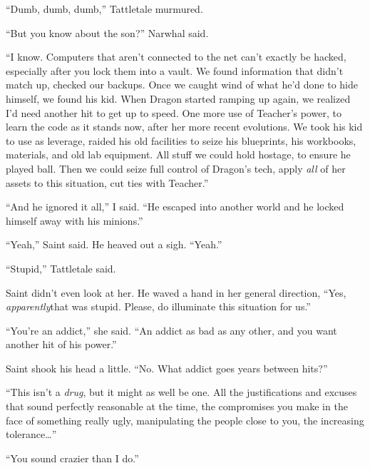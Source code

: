 ``Dumb, dumb, dumb,'' Tattletale murmured.



``But you know about the son?'' Narwhal said.



``I know.  Computers that aren't connected to the net can't exactly be hacked, especially after you lock them into a vault.  We found information that didn't match up, checked our backups.  Once we caught wind of what he'd done to hide himself, we found his kid.  When Dragon started ramping up again, we realized I'd need another hit to get up to speed.  One more use of Teacher's power, to learn the code as it stands now, after her more recent evolutions.  We took his kid to use as leverage, raided his old facilities to seize his blueprints, his workbooks, materials, and old lab equipment.  All stuff we could hold hostage, to ensure he played ball.  Then we could seize full control of Dragon's tech, apply \emph{all} of her assets to this situation, cut ties with Teacher.''



``And he ignored it all,'' I said.  ``He escaped into another world and he locked himself away with his minions.''



``Yeah,'' Saint said.  He heaved out a sigh.  ``Yeah.''



``Stupid,'' Tattletale said.



Saint didn't even look at her.  He waved a hand in her general direction, ``Yes, \emph{apparently}that was stupid.  Please, do illuminate this situation for us.''



``You're an addict,'' she said.  ``An addict as bad as any other, and you want another hit of his power.''



Saint shook his head a little.  ``No.  What addict goes years between hits?''



``This isn't a \emph{drug}, but it might as well be one.  All the justifications and excuses that sound perfectly reasonable at the time, the compromises you make in the face of something really ugly, manipulating the people close to you, the increasing tolerance\ldots''



``You sound crazier than I do.''



